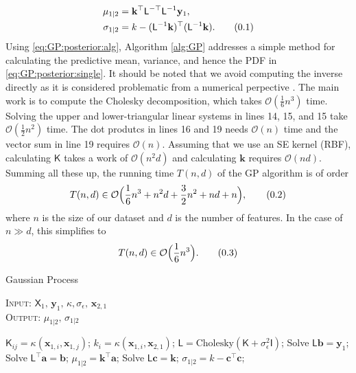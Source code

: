 \documentclass[10pt]{article}
\theoremstyle{definition}
\theoremstyle{definition}
\theoremstyle{remark}
\newcommand\eqnum{\addtocounter{equation}{1}\tag{\arabic{section}.\arabic{equation}}}
\begin{document}
\begin{align*}
\mu_{1|2}  &= \mathbf{k}^{\top}\mathsf{L}^{-\top}\mathsf{L}^{-1}\mathbf{y}_1, \\
\sigma_{1|2} &= k - (\mathsf{L}^{-1}\mathbf{k})^{\top}(\mathsf{L}^{-1}\mathbf{k}).
\eqnum
\label{eq:GP:posterior:alg}
\end{align*}
Using \cref{eq:GP:posterior:alg}, Algorithm \ref{alg:GP} addresses a simple method for calculating the predictive mean, variance, and hence the PDF in \eqref{eq:GP:posterior:single}.  It should be noted that we avoid computing the inverse directly as it is considered problematic from a numerical perpective \cite[Section 4.7]{Gill1991}. The main work is to compute the Cholesky decomposition, which takes $\mathcal{O}(\frac{1}{6}n^3)$ time. Solving the upper and lower-triangular linear systems in lines 14, 15, and 15 take $\mathcal{O}(\frac{1}{2}n^2)$ time. The dot produtcs in lines 16 and 19 needs $\mathcal{O}(n)$ time and the vector sum in line 19 requires $\mathcal{O}(n)$. Assuming that we use an SE kernel (RBF), calculating $\mathsf{K}$ takes a work of $\mathcal{O}(n^2d)$ and calculating $\mathbf{k}$ requires $\mathcal{O}(nd)$. Summing all these up, the running time $T(n,d)$ of the GP algorithm is of order
\begin{equation*}
T(n,d) \in \mathcal{O}\Big(\frac{1}{6}n^3+n^2d+\frac{3}{2}n^2+nd+n\Big),
\eqnum
\end{equation*}
where $n$ is the size of our dataset and $d$ is the number of features. In the case of $n \gg d$, this simplifies to
\begin{equation*}
T(n,d) \in \mathcal{O}\Big(\frac{1}{6}n^3\Big).
\eqnum
\end{equation*}
\begin{algorithm}[t!]
\caption{Gaussian Process}\label{alg:GP}
\hspace*{\algorithmicindent} {\scshape Input}: $\mathsf{X}_1, \, \mathbf{y}_1, \, \kappa, \sigma_{\epsilon}, \, \mathbf{x}_{2,1}$ \\
\hspace*{\algorithmicindent} {\scshape Output}: $\mu_{1|2}, \, \sigma_{1|2}$
\begin{algorithmic}[1]
        \State $\mathsf{K}_{ij} = \kappa(\mathbf{x}_{1,i},\mathbf{x}_{1,j})$;
    \EndFor
\EndFor
{}
    \State $k_{i} = \kappa(\mathbf{x}_{1,i},\mathbf{x}_{2,1})$;
\EndFor
{}
\State $\mathsf{L}=\text{Cholesky}(\mathsf{K}+\sigma_{\epsilon}^2\mathsf{I})$;
\State Solve $\mathsf{L} \mathbf{b} = \mathbf{y}_1$;
\State Solve $\mathsf{L}^{\top} \mathbf{a} = \mathbf{b}$;
\State $\mu_{1|2} = \mathbf{k}^{\top}\mathbf{a}$;
\State Solve $\mathsf{L} \mathbf{c} = \mathbf{k}$;
\State $\sigma_{1|2}=k-\mathbf{c}^{\top}\mathbf{c}$;
\end{algorithmic}
\end{algorithm}
\end{document}
